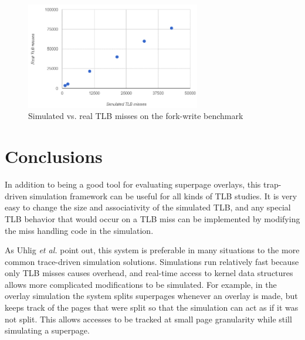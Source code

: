 \begin{figure}
    \centering
    \includegraphics[width=3in]{Figures/Graph2}
    \caption{Simulated vs. real TLB misses on the fork-write benchmark}
    \label{fig:charts}
\end{figure}

\section{Conclusions}

In addition to being a good tool for evaluating superpage overlays, this trap-driven simulation framework can be useful for all kinds of TLB studies. It is very easy to change the size and associativity of the simulated TLB, and any special TLB behavior that would occur on a TLB miss can be implemented by modifying the miss handling code in the simulation.

As Uhlig \emph{et al.} point out, this system is preferable in many situations to the more common trace-driven simulation solutions\cite{Uhlig}. Simulations run relatively fast because only TLB misses causes overhead, and real-time access to kernel data structures allows more complicated modifications to be simulated. For example, in the overlay simulation the system splits superpages whenever an overlay is made, but keeps track of the pages that were split so that the simulation can act as if it was not split. This allows accesses to be tracked at small page granularity while still simulating a superpage.

